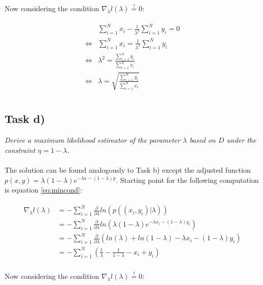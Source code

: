 \documentclass{article}
\begin{document}
Now considering the condition $\nabla_\lambda l(\lambda) \overset{!}{=} 0$:

\begin{align}
\begin{aligned}
& \sum_{i=1}^{N} x_i - \frac{1}{\lambda^2} \sum_{i=1}^{N} y_i = 0 \\
\Leftrightarrow & \sum_{i=1}^{N} x_i = \frac{1}{\lambda^2} \sum_{i=1}^{N} y_i \\
\Leftrightarrow & \lambda^2 = \frac{ \sum_{i=1}^{N} y_i }{\sum_{i=1}^{N} x_i} \\
\Leftrightarrow & \lambda = \sqrt{\frac{ \sum_{i=1}^{N} y_i }{\sum_{i=1}^{N} x_i}} \\
\end{aligned}
\end{align}

\subsection*{Task d)}

\textit{Derive a maximum likelihood estimator of the parameter $\lambda$ based on $D$ under the constraint $\eta = 1 - \lambda$.}\\
\\
The solution can be found analogously to Task b) except the adjusted function $p(x, y) = \lambda( 1- \lambda) e ^ {- \lambda x - (1- \lambda) y}$. Starting point for the following computation is equation \ref{eq:mincond}:

\begin{align}
\begin{aligned}
\nabla_\lambda l(\lambda) & = - \sum_{i=1}^{N} \frac{\partial}{\partial \lambda} ln(p((x_i, y_i)|\lambda))\\
					& = - \sum_{i=1}^{N} \frac{\partial}{\partial \lambda} ln(\lambda( 1- \lambda) e ^ {- \lambda x_i - (1- \lambda) y_i})\\
					& = - \sum_{i=1}^{N} \frac{\partial}{\partial \lambda} (ln(\lambda) + ln( 1- \lambda) - \lambda x_i - (1- \lambda) y_i)\\
					& = - \sum_{i=1}^{N} ( \frac{1}{\lambda} - \frac{1}{1- \lambda} - x_i + y_i) \\
\end{aligned}
\end{align}

Now considering the condition $\nabla_\lambda l(\lambda) \overset{!}{=} 0$:
\end{document}
